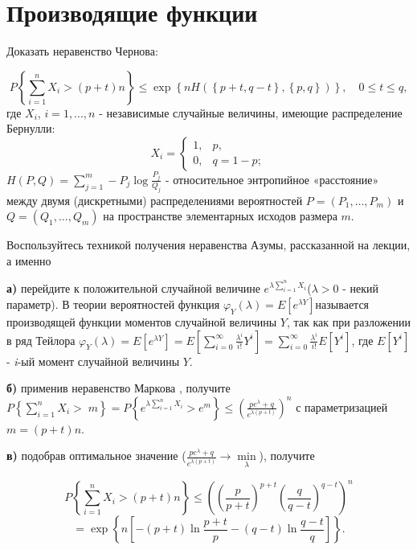 \section{Производящие функции}

\begin{problem}
Доказать неравенство Чернова:

\[P\left\{\sum _{i=1}^{n}X_{i} >(p+t)n \right\}\le \exp \left\{nH\left(\left\{p+t,q-t\right\},\left\{p,q\right\}\right)\right\},\quad 0\le t\le q,\] 
где $X_{i} $, $i=1,...,n$ - независимые случайные величины, имеющие распределение Бернулли:
\[X_{i} =\left\{\begin{array}{cc} {1,} & {p,} \\ {0,} & {q=1-p;} \end{array}\right. \] 
$H\left(P,Q\right)=\sum _{j=1}^{m}-P_{j} \log \frac{P_{j} }{Q_{j} }  $ - относительное энтропийное «расстояние» между двумя (дискретными) распределениями вероятностей $P=\left(P_{1} ,\ldots ,P_{m} \right)$ и $Q=\left(Q_{1} ,\ldots ,Q_{m} \right)$ на пространстве элементарных исходов размера $m$.

\begin{ordre}
 
Воспользуйтесь техникой получения неравенства Азумы, рассказанной на лекции, а именно 

\noindent \textbf{а)} перейдите к положительной случайной величине $e^{\lambda \sum _{i=1}^{n}X_{i}  } $($\lambda >0$ - некий параметр). В теории вероятностей функция $\varphi _{Y} (\lambda )=E\left[e^{\lambda Y} \right]$называется производящей функции моментов случайной величины $Y$, так как при разложении в ряд Тейлора $\varphi _{Y} (\lambda )=E\left[e^{\lambda Y} \right]=E\left[\sum _{i=0}^{\infty }\frac{\lambda ^{i} }{i!} Y^{i}  \right]=\sum _{i=0}^{\infty }\frac{\lambda ^{i} }{i!} E\left[Y^{i} \right] $, где $E\left[Y^{i} \right]$ - \textit{i}-ый момент случайной величины $Y$.

\noindent \textbf{б)} применив неравенство Маркова , получите $P\left\{\sum _{i=1}^{n}X_{i} > \; m\right\}=P\left\{e^{\lambda \sum _{i=1}^{n}X_{i}  } >e^{m} \right\}\le \left(\frac{pe^{\lambda } +q}{e^{\lambda (p+t)} } \right)^{n} $ с параметризацией $m=(p+t)n$.

\noindent \textbf{в)} подобрав оптимальное значение ($\frac{pe^{\lambda } +q}{e^{\lambda (p+t)} } \to \mathop{\min }\limits_{\lambda } $), получите 

\[
P\left\{\sum _{i=1}^{n}X_{i} >(p+t)n \right\}\le \left(\left(\frac{p}{p+t} \right)^{p+t} \left(\frac{q}{q-t} \right)^{q-t} \right)^{n} 
\]
\[
= \exp \left\{n\left[-(p+t)\ln \frac{p+t}{p} -(q-t)\ln \frac{q-t}{q} \right]\right\}.
\] 



\end{ordre}
\end{problem}
